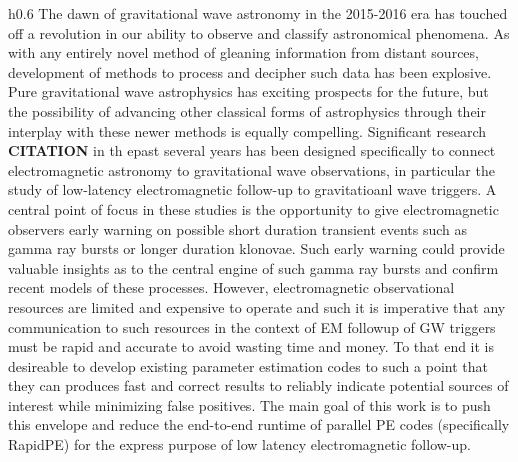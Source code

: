 \documentclass[paper=a4, fontsize=11pt]{scrartcl} %
\numberwithin{equation}{section} %
\numberwithin{figure}{section} %
\numberwithin{table}{section} %
\begin{document}
\begin{wrapfigure}{h}{0.6\textwidth}
The dawn of gravitational wave astronomy in the 2015-2016 era has touched off a revolution in our ability to observe and classify astronomical phenomena. As with any entirely novel method of gleaning information from distant sources, development of methods to process and decipher such data has been explosive. Pure gravitational wave astrophysics has exciting prospects for the future, but the possibility of advancing other classical forms of astrophysics through their interplay with these newer methods is equally compelling. Significant research \textbf{CITATION} in th epast several years has been designed specifically to connect electromagnetic astronomy to gravitational wave observations, in particular the study of low-latency electromagnetic follow-up to gravitatioanl wave triggers. A central point of focus in these studies is the opportunity to give electromagnetic observers early warning on possible short duration transient events such as gamma ray bursts or longer duration klonovae. Such early warning could provide valuable insights as to the central engine of such gamma ray bursts and confirm recent models of these processes. However, electromagnetic observational resources are limited and expensive to operate and such it is imperative that any communication to such resources in the context of EM followup of GW triggers must be rapid and accurate to avoid wasting time and money. To that end it is desireable to develop existing parameter estimation codes to such a point that they can produces fast and correct results to reliably indicate potential sources of interest while minimizing false positives. The main goal of this work is to push this envelope and reduce the end-to-end runtime of parallel PE codes (specifically RapidPE) for the express purpose of low latency electromagnetic follow-up.


\end{wrapfigure}
\end{document}
